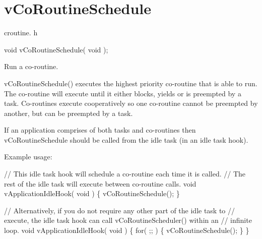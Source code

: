 \hypertarget{group__vCoRoutineSchedule}{}\section{v\+Co\+Routine\+Schedule}
\label{group__vCoRoutineSchedule}
croutine. h 
\begin{DoxyPre}
void vCoRoutineSchedule( void );\end{DoxyPre}


Run a co-\/routine.

v\+Co\+Routine\+Schedule() executes the highest priority co-\/routine that is able to run. The co-\/routine will execute until it either blocks, yields or is preempted by a task. Co-\/routines execute cooperatively so one co-\/routine cannot be preempted by another, but can be preempted by a task.

If an application comprises of both tasks and co-\/routines then v\+Co\+Routine\+Schedule should be called from the idle task (in an idle task hook).

Example usage\+: 
\begin{DoxyPre}
// This idle task hook will schedule a co-routine each time it is called.
// The rest of the idle task will execute between co-routine calls.
void vApplicationIdleHook( void )
\{
   vCoRoutineSchedule();
\}\end{DoxyPre}



\begin{DoxyPre}// Alternatively, if you do not require any other part of the idle task to
// execute, the idle task hook can call vCoRoutineScheduler() within an
// infinite loop.
void vApplicationIdleHook( void )
\{
   for( ;; )
   \{
       vCoRoutineSchedule();
   \}
\}
\end{DoxyPre}
 